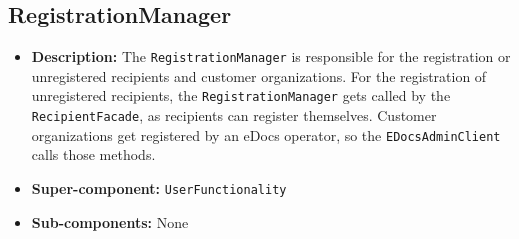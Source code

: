 \documentclass[a4paper,10pt]{article}
\begin{document}
\subsection{RegistrationManager}
\begin{itemize}
    \item \textbf{Description:} The \texttt{RegistrationManager} is responsible for the registration or unregistered recipients and customer organizations. For the registration of unregistered recipients, the \texttt{RegistrationManager} gets called by the \texttt{RecipientFacade}, as recipients can register themselves. Customer organizations get registered by an eDocs operator, so the \texttt{EDocsAdminClient} calls those methods.
    \item \textbf{Super-component:} \texttt{UserFunctionality}
    \item \textbf{Sub-components:} None
\end{itemize}
\end{document}
